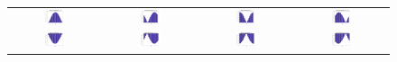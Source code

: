 \begin{figure}[h]
   \centering
   \begin{tabular}{cccc}
	   \includegraphics[width=0.23\textwidth]{fig/double_1_neg_vel_0} &
	   \includegraphics[width=0.23\textwidth]{fig/double_1_neg_vel_pi_2} &
	   \includegraphics[width=0.23\textwidth]{fig/double_1_neg_vel_pi} &
	   \includegraphics[width=0.23\textwidth]{fig/double_1_neg_vel_3pi_2} \\
	   \includegraphics[width=0.23\textwidth]{fig/double_2_neg_vel_0} &
	   \includegraphics[width=0.23\textwidth]{fig/double_2_neg_vel_pi_2} &
	   \includegraphics[width=0.23\textwidth]{fig/double_2_neg_vel_pi} &
	   \includegraphics[width=0.23\textwidth]{fig/double_2_neg_vel_3pi_2} \\

\end{tabular}
\end{figure}

